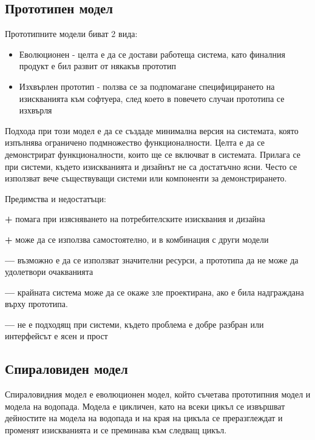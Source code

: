 \documentclass[fleqn,12pt]{article}
\begin{document}
\subsection{Прототипен модел}
Прототипните модели биват 2 вида:

\begin{itemize}
	\item Еволюционен - целта е да се достави работеща система, като финалния продукт е бил развит от някакъв прототип
	\item Изхвърлен прототип - ползва се за подпомагане специфицирането на изискванията към софтуера, след което в повечето случаи прототипа се изхвърля
\end{itemize}

Подхода при този модел е да се създаде минимална версия на системата, която изпълнява ограничено подмножество функционалности. Целта е да се демонстрират функционалности, които ще се включват в системата. Прилага се при системи, където изискванията и дизайнът не са достатъчно ясни. Често се използват вече съществуващи системи или компоненти за демонстрирането.

Предимства и недостатъци:
\begin{description}
	\item \textbf{+} помага при изясняването на потребителските изисквания и дизайна
	\item \textbf{+} може да се използва самостоятелно, и в комбинация с други модели
	\item \textbf{---} възможно е да се използват значителни ресурси, а прототипа да не може да удолетвори очакванията
	\item \textbf{---} крайната система може да се окаже зле проектирана, ако е била надграждана върху прототипа.
	\item \textbf{---} не е подходящ при системи, където проблема е добре разбран или интерфейсът е ясен и прост
\end{description}

\subsection{Спираловиден модел}
Спираловидния модел е еволюционен модел, който съчетава прототипния модел и модела на водопада. Модела е цикличен, като на всеки цикъл се извършват дейностите на модела на водопада и на края на цикъла се преразглеждат и променят изискванията и се преминава към следващ цикъл.
\end{document}
